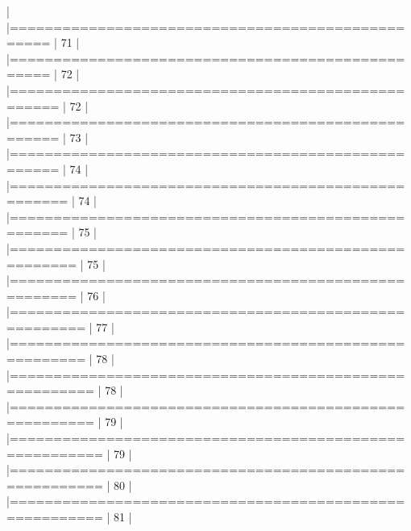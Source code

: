 \documentclass{article}
\begin{document}
\begin{Schunk}
\begin{Soutput}
  |                                                                            
  |==================================================                    |  71%
  |                                                                            
  |==================================================                    |  72%
  |                                                                            
  |===================================================                   |  72%
  |                                                                            
  |===================================================                   |  73%
  |                                                                            
  |===================================================                   |  74%
  |                                                                            
  |====================================================                  |  74%
  |                                                                            
  |====================================================                  |  75%
  |                                                                            
  |=====================================================                 |  75%
  |                                                                            
  |=====================================================                 |  76%
  |                                                                            
  |======================================================                |  77%
  |                                                                            
  |======================================================                |  78%
  |                                                                            
  |=======================================================               |  78%
  |                                                                            
  |=======================================================               |  79%
  |                                                                            
  |========================================================              |  79%
  |                                                                            
  |========================================================              |  80%
  |                                                                            
  |========================================================              |  81%
  |                                                                            

\end{Soutput}
\end{Schunk}
\end{document}
